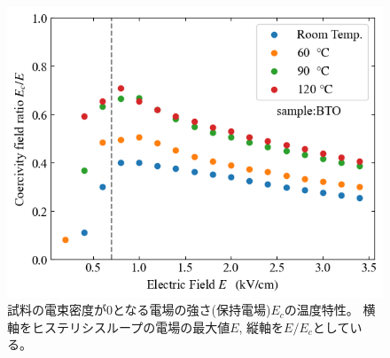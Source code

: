 \documentclass[11pt,dvipdfmx,a4paper]{jsarticle}
\begin{document}
\begin{figure}[H]
\begin{minipage}{0.4\columnwidth}
        \includegraphics[width=\columnwidth]{BTO_Ec-E.png}
        \caption{\small{試料の電束密度が0となる電場の強さ(保持電場)\(E_c\)の温度特性。
        横軸をヒステリシスループの電場の最大値\(E\), 縦軸を\(E/E_c\)としている。}}
        \label{graph:BTO_Ec-E}
    \end{minipage}
\end{figure}
\end{document}
